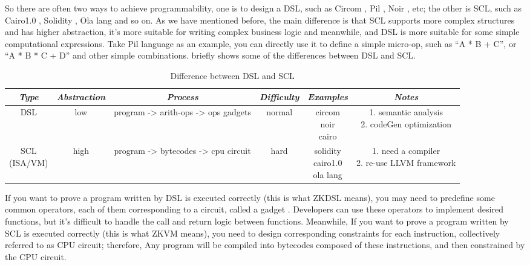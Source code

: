 So there are often two ways to achieve programmability, one is to design a DSL, such as Circom \cite{website:Circom}, Pil \cite{website:Pil}, Noir \cite{website:Noir}, etc; the other is SCL, 
such as Cairo1.0 \cite{website:Cairo1.0}, Solidity \cite{website:Solidity}, Ola lang \cite{website:Ola-lang} and so on. As we have mentioned before, the main difference is that SCL supports more complex structures and has 
higher abstraction, it's more suitable for writing complex business logic and meanwhile, and DSL is more suitable for some simple computational expressions. 
Take Pil \cite{website:Pil} language as an example, you can directly use it to define a simple micro-op, such as ``A * B + C'', or ``A * B * C + D'' and other simple combinations. 
 briefly shows some of the differences between DSL and SCL.

\begin{table}[!ht]
    \centering
    \begin{tabular}{|c|c|c|c|c|c|}
        \hline
        \emph{Type} & \emph{Abstraction} & \emph{Process} & \emph{Difficulty} & \emph{Examples} & \emph{Notes} \\ 
        \hline
        DSL & low & program -> arith-ops -> ops gadgets & normal & \makecell{circom \\ noir \\ cairo} & \makecell{1. semantic analysis \\ 2. codeGen optimization} \\
        \hline
        \makecell{SCL \\ (ISA/VM)} & high & program -> bytecodes -> cpu circuit & hard & \makecell{solidity \\ cairo1.0 \\ ola lang} & \makecell{1. need a compiler \\2. re-use LLVM framework} \\
        \hline
    \end{tabular}
    \caption{Difference between DSL and SCL}
    \label{table:Difference between DSL and SCL}
\end{table}

If you want to prove a program written by DSL is executed correctly (this is what ZKDSL means), you may need to predefine some common operators, each of them corresponding to a circuit, called a gadget \cite{website:Gadget}. 
Developers can use these operators to implement desired functions, but it's difficult to handle the call and return logic between functions. Meanwhile, If you want to prove a program written by SCL is executed correctly (this is what ZKVM means), 
 you need to design corresponding constraints for each instruction, collectively referred to as CPU circuit; therefore, Any program will be compiled into 
 bytecodes composed of these instructions, and then constrained by the CPU circuit.


